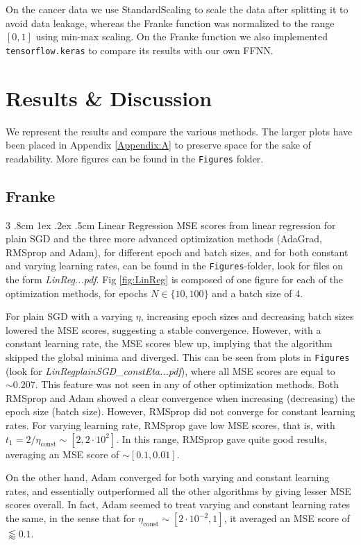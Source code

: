 \documentclass[%
reprint,s
amsmath,amssymb,
aps,
]{revtex4-2}
\makeatletter
\renewcommand{\subsubsection}{%
	\@startsection
	{subsubsection}%
	{3}%
	{\z@}%
	{.8cm \@plus1ex \@minus .2ex}%
	{.5cm}%
	{\normalfont\small\centering}%
}
\makeatother
\begin{document}
On the cancer data we use StandardScaling to scale the data after splitting it to avoid data leakage, whereas the Franke function was normalized to the range $[0,1]$ using min-max scaling. On the Franke function we also implemented \texttt{tensorflow.keras} to compare its results with our own FFNN.


\section{Results \& Discussion}
We represent the results and compare the various methods. The larger plots have been placed in Appendix \ref{Appendix:A} to preserve space for the sake of readability. More figures can be found in the \texttt{Figures} folder.

\subsection{Franke}
\subsubsection{Linear Regression}
MSE scores from linear regression for plain SGD and the three more advanced optimization methods (AdaGrad, RMSprop and Adam), for different epoch and batch sizes, and for both constant and varying learning rates, can be found in the \texttt{Figures}-folder, look for files on the form \emph{LinReg...pdf}. Fig \ref{fig:LinReg} is composed of one figure for each of the optimization methods, for epochs \(N\in\{10, 100\}\) and a batch size of 4. 

For plain SGD with a varying \(\eta\), increasing epoch sizes and decreasing batch sizes lowered the MSE scores, suggesting a stable convergence. However, with a constant learning rate, the MSE scores blew up, implying that the algorithm skipped the global minima and diverged. This can be seen from plots in \texttt{Figures} (look for \emph{LinRegplainSGD\_constEta...pdf}), where all MSE scores are equal to \(\sim 0.207\). This feature was not seen in any of other optimization methods. Both RMSprop and Adam showed a clear convergence when increasing (decreasing) the epoch size (batch size). However, RMSprop did not converge for constant learning rates. For varying learning rate, RMSprop gave low MSE scores, that is, with \(t_{1} = 2/\eta_{\text{const}}\sim [2, 2\cdot 10^{2}]\). In this range, RMSprop gave quite good results, averaging an MSE score of \(\sim [0.1, 0.01]\). 

On the other hand, Adam converged for both varying and constant learning rates, and essentially outperformed all the other algorithms by giving lesser MSE scores overall. In fact, Adam seemed to treat varying and constant learning rates the same, in the sense that for \(\eta_{\text{const}}\sim[2\cdot10^{-2}, 1]\), it averaged an MSE score of \(\lessapprox 0.1\).
\end{document}
